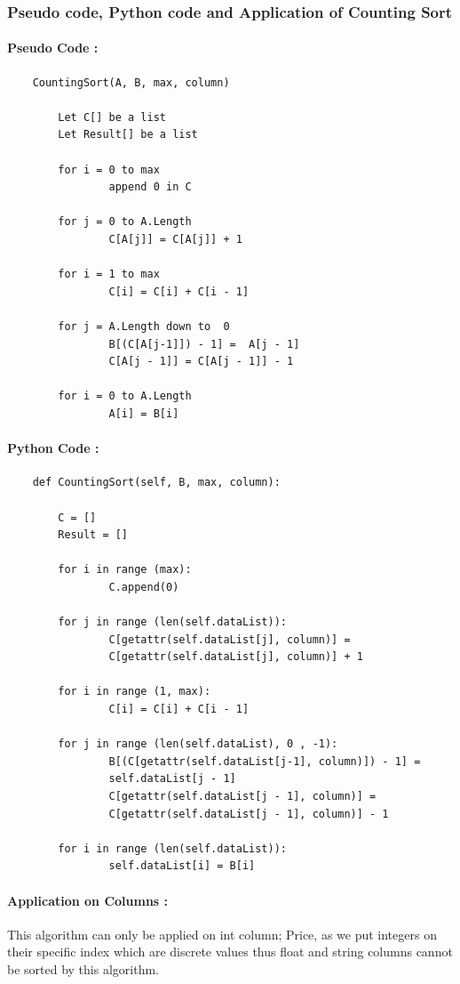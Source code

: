 \documentclass[12pt]{article}
\begin{document}
    \newpage
    \subsubsection{Pseudo code, Python code and Application of Counting Sort}
    \paragraph{Pseudo Code :}
    \begin{verbatim}
    CountingSort(A, B, max, column)

        Let C[] be a list
        Let Result[] be a list

        for i = 0 to max
                append 0 in C

        for j = 0 to A.Length
                C[A[j]] = C[A[j]] + 1

        for i = 1 to max
                C[i] = C[i] + C[i - 1]

        for j = A.Length down to  0 
                B[(C[A[j-1]]) - 1] =  A[j - 1]      
                C[A[j - 1]] = C[A[j - 1]] - 1

        for i = 0 to A.Length
                A[i] = B[i]
    \end{verbatim}
    \paragraph{Python Code :}
    \begin{verbatim}
    def CountingSort(self, B, max, column):

        C = []
        Result = []

        for i in range (max):
                C.append(0)

        for j in range (len(self.dataList)):
                C[getattr(self.dataList[j], column)] =
                C[getattr(self.dataList[j], column)] + 1

        for i in range (1, max):
                C[i] = C[i] + C[i - 1]

        for j in range (len(self.dataList), 0 , -1):
                B[(C[getattr(self.dataList[j-1], column)]) - 1] =
                self.dataList[j - 1]      
                C[getattr(self.dataList[j - 1], column)] =
                C[getattr(self.dataList[j - 1], column)] - 1

        for i in range (len(self.dataList)):
                self.dataList[i] = B[i]
    \end{verbatim}
    \paragraph{Application on Columns :} 
    This algorithm can only be applied on int column; Price, as we put integers on their specific index which are discrete values thus float and string columns cannot be sorted by this algorithm.
    
\end{document}
